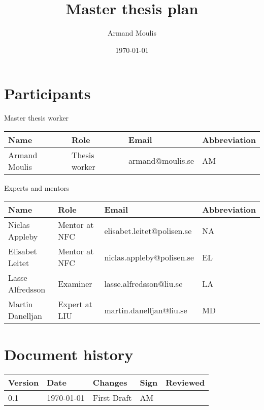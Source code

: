 \documentclass{article}
\begin{document}
\setlength{\hoffset}{-40pt} %
\setlength{\textwidth}{430pt}


\title{Master thesis plan}
\author{Armand Moulis}
\date{\today}
\maketitle
\newpage

\section*{Participants}
\begin{center}
	Master thesis worker 
\end{center}
\begin{center}
	\begin{tabular}{|l|l|l|l|}
		\hline
		Name          & Role          & Email            & Abbreviation \\ \hline
		Armand Moulis & Thesis worker & armand@moulis.se & AM           \\ \hline
	\end{tabular}
\end{center}

\begin{center}
	Experts and mentors
\end{center}

\begin{center}
	\begin{tabular}{|l|l|l|l|}
		\hline
		Name             & Role          & Email                      & Abbreviation \\ \hline
		Niclas Appleby   & Mentor at NFC & elisabet.leitet@polisen.se & NA           \\ \hline
		Elisabet Leitet  & Mentor at NFC & niclas.appleby@polisen.se  & EL           \\ \hline
		Lasse Alfredsson & Examiner      & lasse.alfredsson@liu.se    & LA           \\ \hline
		Martin Danelljan & Expert at LIU & martin.danelljan@liu.se    & MD           \\ \hline
	\end{tabular}
\end{center}
\newpage


\newpage
\setcounter{tocdepth}{3}
\tableofcontents
\newpage

\section*{Document history}
\begin{center}
	\begin{tabular}{|l|l| p{5cm} |l|l| }
		\hline
		Version &  Date  & Changes     & Sign & Reviewed \\ \hline
		  0.1   & \today & First Draft & AM   &  \\ \hline
	\end{tabular}
\end{center}
\newpage
\end{document}
